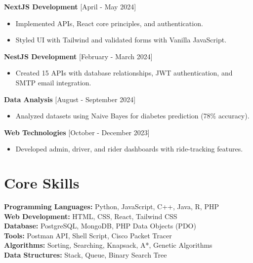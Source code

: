 \documentclass[a4paper,10pt]{article}
\begin{document}
\begin{paracol}{2}
\vspace{1em} 

\textbf{NextJS Development} [April - May 2024] \\
\begin{itemize}
    \item Implemented APIs, React core principles, and authentication.
    \item Styled UI with Tailwind and validated forms with Vanilla JavaScript.
\end{itemize}

\textbf{NestJS Development} [February - March 2024] \\
\begin{itemize}
    \item Created 15 APIs with database relationships, JWT authentication, and SMTP email integration.
\end{itemize}

\textbf{Data Analysis} [August - September 2024] \\
\begin{itemize}
    \item Analyzed datasets using Naive Bayes for diabetes prediction (78\% accuracy).
\end{itemize}

\textbf{Web Technologies} [October - December 2023] \\
\begin{itemize}
    \item Developed admin, driver, and rider dashboards with ride-tracking features.
\end{itemize}

\section*{Core Skills}
\textbf{Programming Languages:} Python, JavaScript, C++, Java, R, PHP \\
\textbf{Web Development:} HTML, CSS, React, Tailwind CSS \\
\textbf{Database:} PostgreSQL, MongoDB, PHP Data Objects (PDO) \\
\textbf{Tools:} Postman API, Shell Script, Cisco Packet Tracer \\
\textbf{Algorithms:} Sorting, Searching, Knapsack, A*, Genetic Algorithms \\
\textbf{Data Structures:} Stack, Queue, Binary Search Tree

\end{paracol}
\end{document}
